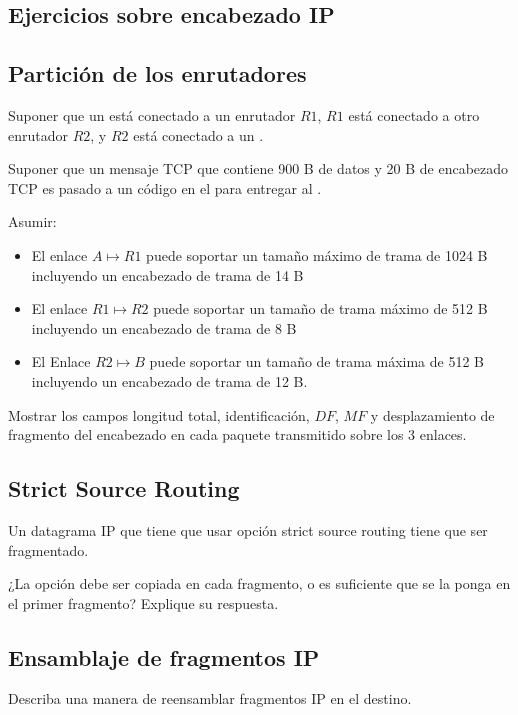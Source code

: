 \documentclass[12pt]{report}
\begin{document}
\begin{exer}
	\section{Ejercicios sobre encabezado IP}
	\subsection{Partición de los enrutadores \sfour \shard}
	Suponer que un  está conectado a un enrutador $R1$, $R1$ está conectado a otro
	enrutador $R2$, y $R2$ está conectado a un .

	Suponer que un mensaje TCP que contiene 900 B de datos y 20 B de encabezado TCP es pasado a un código  en el  para entregar al .

	Asumir:
	\begin{itemize}
		\item El enlace $A \mapsto R1$ puede soportar un tamaño máximo de trama de 1024 B incluyendo un encabezado de trama de 14 B
		\item El enlace $R1 \mapsto R2$ puede soportar un tamaño de trama máximo de 512 B incluyendo un encabezado de trama de 8 B
		\item El Enlace $R2 \mapsto B$ puede soportar un tamaño de trama máxima de 512 B incluyendo un encabezado de trama de 12 B.
	\end{itemize}

	Mostrar los campos longitud total, identificación, $DF$, $MF$ y desplazamiento de fragmento del encabezado
	 en cada paquete transmitido sobre los 3 enlaces.
\end{exer}

\begin{exer}
	\subsection{Strict Source Routing \stwo \steo}
	Un datagrama IP que tiene que usar opción strict source routing tiene que ser
	fragmentado.

	¿La opción debe ser copiada en cada fragmento, o es suficiente que se la ponga en el primer fragmento? Explique su respuesta.
\end{exer}

\begin{exer}
	\subsection{Ensamblaje de fragmentos IP \sthree \steo}
	Describa una manera de reensamblar fragmentos IP en el destino.
\end{exer}
\end{document}
